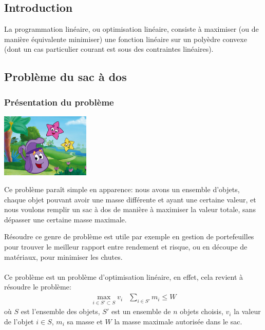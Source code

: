 \subsection{Introduction}
  La programmation linéaire, ou optimisation linéaire, consiste à maximiser (ou
  de manière équivalente minimiser) une fonction linéaire sur un polyèdre
  convexe (dont un cas particulier courant est sous des contraintes linéaires).

\subsection{Problème du sac à dos}
  \subsubsection{Présentation du problème}
    \begin{center}\includegraphics[width=120pt]{sac_a_dos.jpg}\end{center}

    Ce problème paraît simple en apparence: nous avons un ensemble d'objets,
    chaque objet pouvant avoir une masse différente et ayant une certaine
    valeur, et nous voulons remplir un sac à dos de manière à maximiser la
    valeur totale, sans dépasser une certaine masse maximale.

    Résoudre ce genre de problème est utile par exemple en gestion de
    portefeuilles pour trouver le meilleur rapport entre rendement et risque,
    ou en découpe de matériaux, pour minimiser les chutes.

    \paragraph{}
    Ce problème est un problème d'optimisation linéaire, en effet, cela revient
    à résoudre le problème:
    \[ \begin{array}{r|l}
        \displaystyle\max_{i \in S' \subset S} v_i &
        \displaystyle\sum_{i \in S'} m_i \leq W
      \end{array}
    \]
    où $S$ est l'ensemble des objets, $S'$ est un ensemble de $n$ objets
    choisis, $v_i$ la valeur de l'objet $i \in S$, $m_i$ sa masse et $W$ la
    masse maximale autorisée dans le sac.

